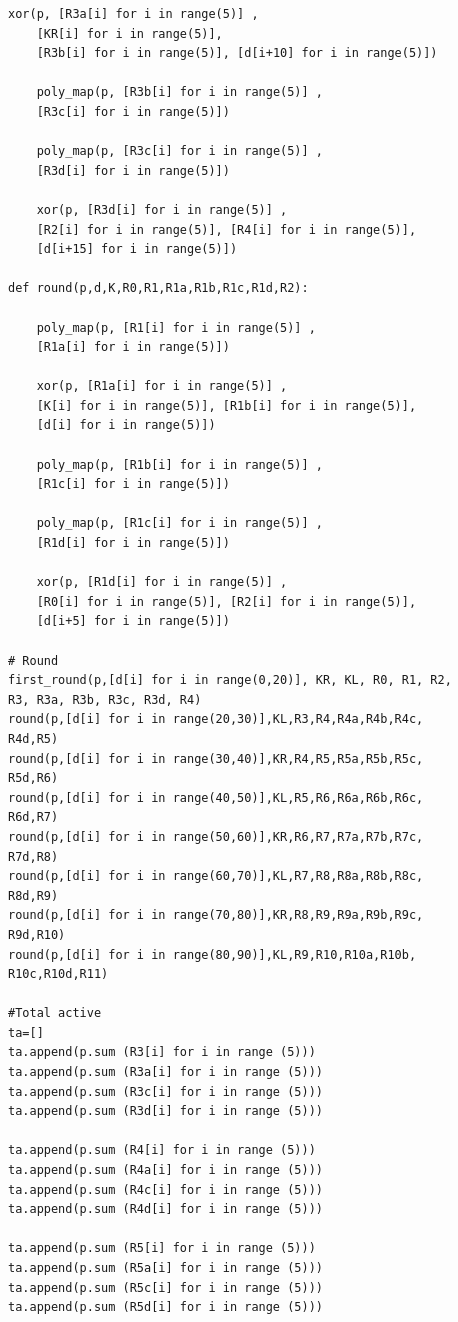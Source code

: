 \begin{lstlisting}[caption={ITUbee SageMath Related Key Differential Cryptanalysis MILP model }, label={lst:milp-Rkey}]
    xor(p, [R3a[i] for i in range(5)] , 
    [KR[i] for i in range(5)], 
    [R3b[i] for i in range(5)], [d[i+10] for i in range(5)])

    poly_map(p, [R3b[i] for i in range(5)] , 
    [R3c[i] for i in range(5)])

    poly_map(p, [R3c[i] for i in range(5)] , 
    [R3d[i] for i in range(5)])

    xor(p, [R3d[i] for i in range(5)] , 
    [R2[i] for i in range(5)], [R4[i] for i in range(5)], 
    [d[i+15] for i in range(5)])
    
def round(p,d,K,R0,R1,R1a,R1b,R1c,R1d,R2):
    
    poly_map(p, [R1[i] for i in range(5)] , 
    [R1a[i] for i in range(5)])

    xor(p, [R1a[i] for i in range(5)] , 
    [K[i] for i in range(5)], [R1b[i] for i in range(5)], 
    [d[i] for i in range(5)])

    poly_map(p, [R1b[i] for i in range(5)] , 
    [R1c[i] for i in range(5)])

    poly_map(p, [R1c[i] for i in range(5)] , 
    [R1d[i] for i in range(5)])

    xor(p, [R1d[i] for i in range(5)] , 
    [R0[i] for i in range(5)], [R2[i] for i in range(5)], 
    [d[i+5] for i in range(5)])
    
# Round 
first_round(p,[d[i] for i in range(0,20)], KR, KL, R0, R1, R2, 
R3, R3a, R3b, R3c, R3d, R4)
round(p,[d[i] for i in range(20,30)],KL,R3,R4,R4a,R4b,R4c,
R4d,R5)
round(p,[d[i] for i in range(30,40)],KR,R4,R5,R5a,R5b,R5c,
R5d,R6)
round(p,[d[i] for i in range(40,50)],KL,R5,R6,R6a,R6b,R6c,
R6d,R7)
round(p,[d[i] for i in range(50,60)],KR,R6,R7,R7a,R7b,R7c,
R7d,R8)
round(p,[d[i] for i in range(60,70)],KL,R7,R8,R8a,R8b,R8c,
R8d,R9)
round(p,[d[i] for i in range(70,80)],KR,R8,R9,R9a,R9b,R9c,
R9d,R10)
round(p,[d[i] for i in range(80,90)],KL,R9,R10,R10a,R10b,
R10c,R10d,R11)

#Total active
ta=[]
ta.append(p.sum (R3[i] for i in range (5))) 
ta.append(p.sum (R3a[i] for i in range (5)))
ta.append(p.sum (R3c[i] for i in range (5)))
ta.append(p.sum (R3d[i] for i in range (5)))

ta.append(p.sum (R4[i] for i in range (5))) 
ta.append(p.sum (R4a[i] for i in range (5)))
ta.append(p.sum (R4c[i] for i in range (5)))
ta.append(p.sum (R4d[i] for i in range (5)))

ta.append(p.sum (R5[i] for i in range (5))) 
ta.append(p.sum (R5a[i] for i in range (5)))
ta.append(p.sum (R5c[i] for i in range (5)))
ta.append(p.sum (R5d[i] for i in range (5)))


\end{lstlisting}
